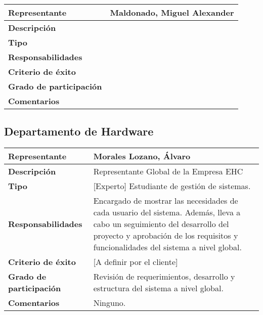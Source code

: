         \begin{tabular}{|p{4cm}|p{12cm}|}
            \hline \textbf{Representante} &  Maldonado, Miguel Alexander \\
            \hline \textbf{Descripción} &  \\
            \hline \textbf{Tipo} &  \\
            \hline \textbf{Responsabilidades} &  \\
            \hline \textbf{Criterio de éxito} &  \\
            \hline \textbf{Grado de participación} &  \\
            \hline \textbf{Comentarios} &  \\
            \hline
        \end{tabular}

    \subsection{Departamento de Hardware}

        \begin{tabular}{|p{4cm}|p{12cm}|}
            \hline \textbf{Representante} & Morales Lozano, Álvaro \\
            \hline \textbf{Descripción} &  Representante Global de la Empresa EHC\\
            \hline \textbf{Tipo} &  [Experto] Estudiante de gestión de sistemas.\\
            \hline \textbf{Responsabilidades} &  Encargado de mostrar las necesidades de cada usuario del sistema. Además, lleva a cabo un seguimiento del desarrollo del proyecto y aprobación de  los requisitos y funcionalidades del sistema a nivel global.\\
            \hline \textbf{Criterio de éxito} &  [A definir por el cliente]\\
            \hline \textbf{Grado de participación} &  Revisión de requerimientos, desarrollo y estructura del sistema a nivel global.\\
            \hline \textbf{Comentarios} &  Ninguno.\\
            \hline
        \end{tabular}

